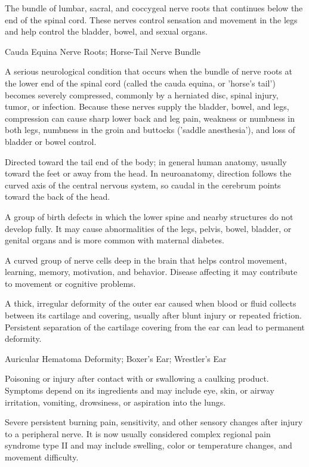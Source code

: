  The bundle of lumbar, sacral, and coccygeal nerve roots that continues below the end of the spinal cord. These nerves control sensation and movement in the legs and help control the bladder, bowel, and sexual organs.

\synonyms
Cauda Equina Nerve Roots; Horse-Tail Nerve Bundle

 A serious neurological condition that occurs when the bundle of nerve roots at the lower end of the spinal cord (called the cauda equina, or 'horse's tail') becomes severely compressed, commonly by a herniated disc, spinal injury, tumor, or infection. Because these nerves supply the bladder, bowel, and legs, compression can cause sharp lower back and leg pain, weakness or numbness in both legs, numbness in the groin and buttocks ('saddle anesthesia'), and loss of bladder or bowel control.

 Directed toward the tail end of the body; in general human anatomy, usually toward the feet or away from the head. In neuroanatomy, direction follows the curved axis of the central nervous system, so caudal in the cerebrum points toward the back of the head.

 A group of birth defects in which the lower spine and nearby structures do not develop fully. It may cause abnormalities of the legs, pelvis, bowel, bladder, or genital organs and is more common with maternal diabetes.

 A curved group of nerve cells deep in the brain that helps control movement, learning, memory, motivation, and behavior. Disease affecting it may contribute to movement or cognitive problems.

 A thick, irregular deformity of the outer ear caused when blood or fluid collects between its cartilage and covering, usually after blunt injury or repeated friction. Persistent separation of the cartilage covering from the ear can lead to permanent deformity.

\synonyms
Auricular Hematoma Deformity; Boxer's Ear; Wrestler's Ear

 Poisoning or injury after contact with or swallowing a caulking product. Symptoms depend on its ingredients and may include eye, skin, or airway irritation, vomiting, drowsiness, or aspiration into the lungs.

 Severe persistent burning pain, sensitivity, and other sensory changes after injury to a peripheral nerve. It is now usually considered complex regional pain syndrome type II and may include swelling, color or temperature changes, and movement difficulty.

